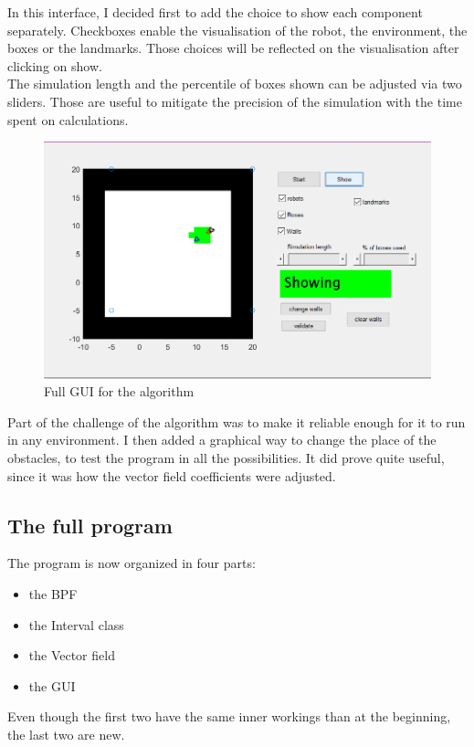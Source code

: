 In this interface, I decided first to add the choice to show each component separately. Checkboxes enable the visualisation of the robot, the environment, the boxes or the landmarks.
Those choices will be reflected on the visualisation after clicking on show.\\

The simulation length and the percentile of boxes shown can be adjusted via two sliders.
Those are useful to mitigate the precision of the simulation with the time spent on calculations.\\

\begin{figure}[H]
\centering
\includegraphics[scale=0.7]{Figures/Gui}
\decoRule
\caption[Gui]{Full GUI for the algorithm}
\label{fig:gui}
\end{figure}

Part of the challenge of the algorithm was to make it reliable enough for it to run in any environment.
I then added a graphical way to change the place of the obstacles, to test the program in all the possibilities.
It did prove quite useful, since it was how the vector field coefficients were adjusted.


\subsection{The full program}

The program is now organized in four parts:
\begin{itemize}
  \item the BPF
  \item the Interval class
  \item the Vector field
  \item the GUI
\end{itemize}
Even though the first two have the same inner workings than at the beginning, the last two are new.

